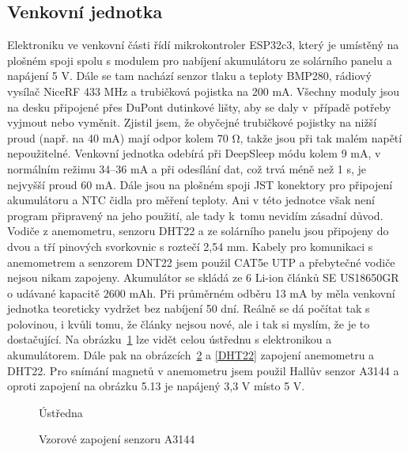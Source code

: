         \subsection{Venkovní jednotka}
            Elektroniku ve venkovní části řídí mikrokontroler ESP32c3, který je umístěný na plošném spoji spolu s modulem pro nabíjení akumulátoru ze solárního panelu a napájení 5 V. Dále se tam nachází senzor tlaku a teploty BMP280, rádiový vysílač NiceRF 433 MHz a trubičková pojistka na 200 mA. Všechny moduly jsou na desku připojené přes DuPont dutinkové lišty, aby se daly v~případě potřeby vyjmout nebo vyměnit. Zjistil jsem, že obyčejné trubičkové pojistky na nižší proud (např. na 40 mA) mají odpor kolem 70 Ω, takže jsou při tak malém napětí nepoužitelné. Venkovní jednotka odebírá při DeepSleep módu kolem 9 mA, v normálním režimu 34–36 mA a při odesílání dat, což trvá méně než 1 s, je nejvyšší proud 60 mA. Dále jsou na plošném spoji JST konektory pro připojení akumulátoru a NTC čidla pro měření teploty. Ani v této jednotce však není program připravený na jeho použití, ale tady k~tomu nevidím zásadní důvod. Vodiče z anemometru, senzoru DHT22 a ze solárního panelu jsou připojeny do dvou a tří pinových svorkovnic s roztečí 2,54 mm. Kabely pro komunikaci s anemometrem a senzorem DNT22 jsem použil CAT5e UTP a přebytečné vodiče nejsou nikam zapojeny. Akumulátor se skládá ze 6 Li-ion článků SE US18650GR o udávané kapacitě $2600$ mAh. Při průměrném odběru 13 mA by měla venkovní jednotka teoreticky vydržet bez nabíjení 50 dní. Reálně se dá počítat tak s polovinou, i kvůli tomu, že články nejsou nové, ale i tak si myslím, že je to dostačující. Na obrázku~\ref{Ustredna} lze vidět celou ústřednu s elektronikou a akumulátorem. Dále pak na obrázcích~\ref{A3144} a \ref{DHT22} zapojení anemometru a DHT22. Pro snímání magnetů v anemometru jsem použil Hallův senzor A3144 a oproti zapojení na obrázku 5.13 je napájený 3,3 V místo 5 V.

            \begin{figure}[htb]
            \caption{Ústředna}
            \label{Ustredna}
            \end{figure}

            \begin{figure}[htb]
            \caption{Vzorové zapojení senzoru A3144~\cite{A3144Hall}}
            \label{A3144}
            \end{figure}

